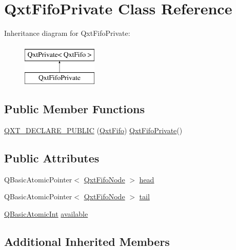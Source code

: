 \hypertarget{class_qxt_fifo_private}{\section{Qxt\-Fifo\-Private Class Reference}
\label{class_qxt_fifo_private}
}
Inheritance diagram for Qxt\-Fifo\-Private\-:\begin{figure}[H]
\begin{center}
\leavevmode
\includegraphics[height=2.000000cm]{class_qxt_fifo_private}
\end{center}
\end{figure}
\subsection*{Public Member Functions}
\begin{DoxyCompactItemize}
\item 
\hyperlink{class_qxt_fifo_private_a645eda752fd3a3f33e280c4357fcff02}{Q\-X\-T\-\_\-\-D\-E\-C\-L\-A\-R\-E\-\_\-\-P\-U\-B\-L\-I\-C} (\hyperlink{class_qxt_fifo}{Qxt\-Fifo}) \hyperlink{class_qxt_fifo_private}{Qxt\-Fifo\-Private}()
\end{DoxyCompactItemize}
\subsection*{Public Attributes}
\begin{DoxyCompactItemize}
\item 
Q\-Basic\-Atomic\-Pointer$<$ \hyperlink{struct_qxt_fifo_node}{Qxt\-Fifo\-Node} $>$ \hyperlink{class_qxt_fifo_private_a5f3f198e97cfd5fd77d23278622fe15b}{head}
\item 
Q\-Basic\-Atomic\-Pointer$<$ \hyperlink{struct_qxt_fifo_node}{Qxt\-Fifo\-Node} $>$ \hyperlink{class_qxt_fifo_private_a1b84b3391bf3eca7eccd5cddc88faada}{tail}
\item 
\hyperlink{qxtfifo_8cpp_a7a80a1b7c12befebb3c827a2702afc8f}{Q\-Basic\-Atomic\-Int} \hyperlink{class_qxt_fifo_private_afc8e6fc5f0d4d3d4bf0ab26bd03a7bef}{available}
\end{DoxyCompactItemize}
\subsection*{Additional Inherited Members}


